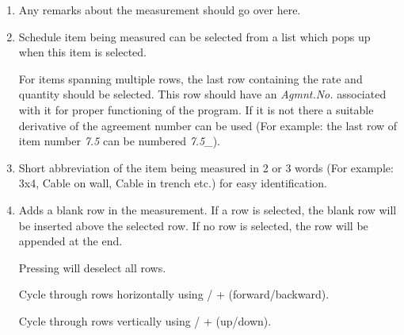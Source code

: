 \documentclass[twoside,a4paper]{refart}
\newenvironment{noteblock}[1]%
{\begin{mdframed}[topline=false,bottomline=false, rightline=false,
		linewidth=2pt, frametitle={#1}]}%
		{\end{mdframed}}
\begin{document}
	 \begin{enumerate}
	 	\item Any remarks about the measurement should go over here.
	 	\item Schedule item being measured can be selected from a list which pops up when this item is selected.\\
	 	\begin{noteblock}{Note:}
	 		For items spanning multiple rows, the last row containing the rate and quantity should be selected. This row should have an \emph{Agmnt.No.} associated with it for proper functioning of the program. If it is not there a suitable derivative of the agreement number can be used (For example: the last row of item number \emph{7.5} can be numbered \emph{7.5\_}).
 		\end{noteblock}
 		\item Short abbreviation of the item being measured in 2 or 3 words (For example: 3x4, Cable on wall, Cable in trench etc.) for easy identification.
	 	\item Adds a blank row in the measurement. If a row is selected, the blank row will be inserted above the selected row. If no row is selected, the row will be appended at the end.\\
	 	\begin{noteblock}{Tips!}
		 		Pressing  will deselect all rows.
		 		
		 		Cycle through rows horizontally using  / + (forward/backward).
		 		
		 		Cycle through rows vertically using  / + (up/down).
		 		

\end{noteblock}
\end{enumerate}
\end{document}
